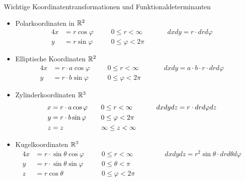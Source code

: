 \begin{Rechenregeln}{Wichtige Koordinatentransformationen und Funktionaldeterminanten}{}
    \begin{itemize}
       \item Polarkoordinaten in $\mathbb{R}^2$ \begin{alignat*}{4}
            x &= r \cos \varphi\quad &&0 \leq r < \infty\quad &&&dxdy = r \cdot drd\varphi\\
            y &= r \sin \varphi\quad &&0 \leq \varphi < 2\pi\quad
        \end{alignat*}
        \item Elliptische Koordinaten $\mathbb{R}^2$ \begin{alignat*}{4}
            x &= r \cdot  a \cos \varphi\quad &&0 \leq r < \infty\quad &&&dxdy = a \cdot b \cdot  r \cdot drd\varphi\\
            y &= r \cdot b \sin \varphi\quad &&0 \leq \varphi < 2\pi\quad
        \end{alignat*}
        \item Zylinderkoordinaten $\mathbb{R}^3$ \begin{alignat*}{4}
            x &= r \cdot  a \cos \varphi\quad &&0 \leq r < \infty\quad &&&dxdydz = r \cdot drd\varphi dz\\
            y &= r \cdot b \sin \varphi\quad &&0 \leq \varphi < 2\pi\quad\\
            z &= z\quad &&\-\infty \leq z < \infty\quad
        \end{alignat*}
        \item Kugelkoordinaten $\mathbb{R}^3$ \begin{alignat*}{4}
            x &= r \cdot \sin \theta \cos \varphi \quad &&0 \leq r < \infty\quad &&&dxdydz = r^2 \sin \theta \cdot drd\theta d\varphi\\
            y &= r \cdot \sin \theta \sin \varphi \quad && 0 \leq \theta < \pi\quad\\
            z &= r \cos \theta \quad &&0 \leq \varphi < 2\pi\quad\quad
        \end{alignat*}
   \end{itemize}
\end{Rechenregeln}
